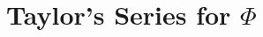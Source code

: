 \documentclass{article}
\newcommand{\abs}[1]{\left| #1 \right|}
\DeclareMathOperator{\sinc}{sinc}
\begin{document}

\section{Taylor's Series for $\Phi$} \label{sec:taylor_series_phi}
\end{document}
